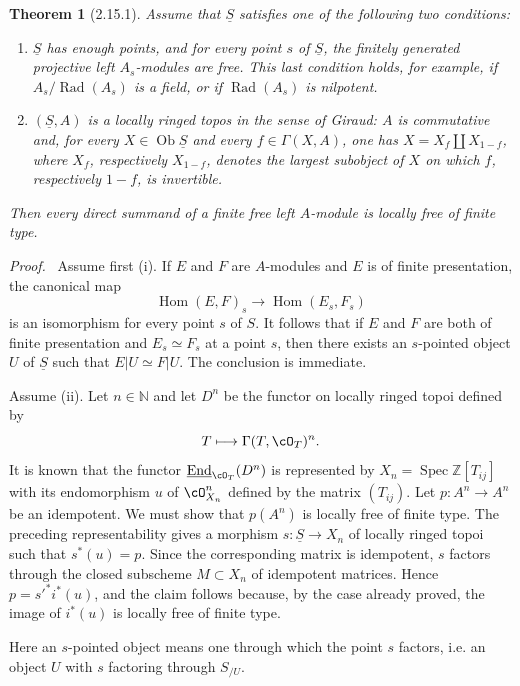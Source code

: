 \documentclass[11pt]{article}
\theoremstyle{plain}
\newtheorem*{theorem*}{Theorem}
\theoremstyle{definition}
\theoremstyle{remark}
\newenvironment{prooftext}{\par\noindent\textit{Proof.}\ }{\par\medskip}
\newcommand{\NN}{\mathbb N}
\newcommand{\ZZ}{\mathbb Z}
\DeclareMathOperator{\Spec}{Spec}
\DeclareMathOperator{\Hom}{Hom}
\DeclareMathOperator{\ob}{Ob}
\providecommand{\uS}{\underline{S}}
\providecommand{\Rad}{\operatorname{Rad}}
\begin{document}
\begin{theorem*}[2.15.1]
Assume that $\uS$ satisfies one of the following two conditions:
\begin{enumerate}[label=(\roman*)]
\item $\uS$ has enough points, and for every point $s$ of $\uS$, the finitely generated projective left $A_s$-modules are free. This last condition holds, for example, if $A_s/\Rad(A_s)$ is a field, or if $\Rad(A_s)$ is nilpotent.
\item $(\uS,A)$ is a locally ringed topos in the sense of Giraud: $A$ is commutative and, for every $X\in\ob\uS$ and every $f\in\Gamma(X,A)$, one has $X=X_f\amalg X_{1-f}$, where $X_f$, respectively $X_{1-f}$, denotes the largest subobject of $X$ on which $f$, respectively $1-f$, is invertible.
\end{enumerate}
Then every direct summand of a finite free left $A$-module is locally free of finite type.
\end{theorem*}

\begin{prooftext}
Assume first (i). If $E$ and $F$ are $A$-modules and $E$ is of finite presentation, the canonical map
\[
\Hom(E,F)_s\longrightarrow\Hom(E_s,F_s)
\]
is an isomorphism for every point $s$ of $S$. It follows that if $E$ and $F$ are both of finite presentation and $E_s\simeq F_s$ at a point $s$, then there exists an $s$-pointed object $U$ of $\uS$ such that $E|U\simeq F|U$. The conclusion is immediate.

Assume (ii). Let $n\in\NN$ and let $D^n$ be the functor on locally ringed topoi defined by
\[
T\longmapsto \Gamma(T,\cO_T)^n.
\]
It is known that the functor $\underline{\operatorname{End}}_{\cO_T}(D^n)$ is represented by $X_n=\Spec\ZZ[T_{ij}]$ with its endomorphism $u$ of $\cO_{X_n}^n$ defined by the matrix $(T_{ij})$. Let $p:A^n\to A^n$ be an idempotent. We must show that $p(A^n)$ is locally free of finite type. The preceding representability gives a morphism $s:\uS\to X_n$ of locally ringed topoi such that $s^*(u)=p$. Since the corresponding matrix is idempotent, $s$ factors through the closed subscheme $M\subset X_n$ of idempotent matrices. Hence $p=s'^*i^*(u)$, and the claim follows because, by the case already proved, the image of $i^*(u)$ is locally free of finite type.
\end{prooftext}

Here an $s$-pointed object means one through which the point $s$ factors, i.e. an object $U$ with $s$ factoring through $S_{/U}$.
\end{document}
